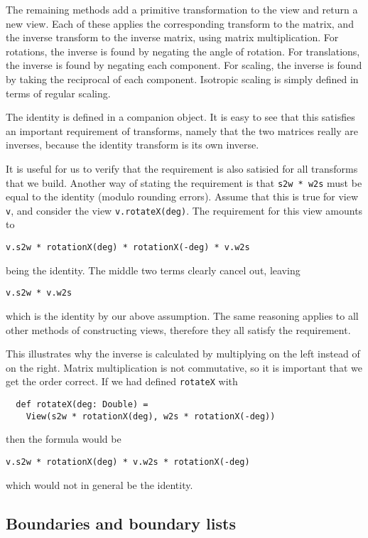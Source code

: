 The remaining methods add a primitive transformation to the view
and return a new view.
Each of these applies the corresponding transform to the matrix,
and the inverse transform to the inverse matrix,
using matrix multiplication.
For rotations, the inverse is found by negating the angle of rotation.
For translations, the inverse is found by negating each component.
For scaling, the inverse is found by taking the reciprocal of each component.
Isotropic scaling is simply defined in terms of regular scaling.

The identity is defined in a companion object.
It is easy to see that this satisfies an important requirement of transforms,
namely that the two matrices really are inverses,
because the identity transform is its own inverse.

It is useful for us to verify that
the requirement is also satisied for all transforms that we build.
Another way of stating the requirement is that
\verb!s2w * w2s! must be equal to the identity
(modulo rounding errors).
Assume that this is true for view \verb!v!,
and consider the view \verb!v.rotateX(deg)!.
The requirement for this view amounts to
\begin{center}
\verb!v.s2w * rotationX(deg) * rotationX(-deg) * v.w2s!
\end{center}
being the identity.
The middle two terms clearly cancel out, leaving
\begin{center}
\verb!v.s2w * v.w2s!
\end{center}
which is the identity by our above assumption.
The same reasoning applies to all other methods of constructing views,
therefore they all satisfy the requirement.

This illustrates why the inverse is calculated by
multiplying on the left instead of on the right.
Matrix multiplication is not commutative,
so it is important that we get the order correct.
If we had defined \verb!rotateX! with
\code
\begin{verbatim}
  def rotateX(deg: Double) =
    View(s2w * rotationX(deg), w2s * rotationX(-deg))
\end{verbatim}
\normalsize
then the formula would be
\begin{center}
\verb!v.s2w * rotationX(deg) * v.w2s * rotationX(-deg)!
\end{center}
which would not in general be the identity.


\subsection{Boundaries and boundary lists\label{sec:boundaries}}

